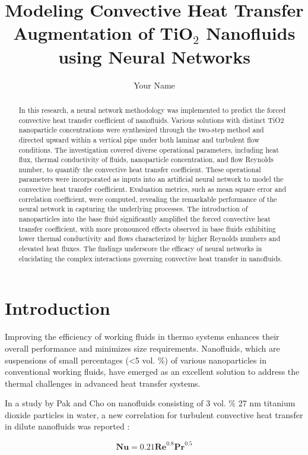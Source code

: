 \documentclass{article}
\title{Modeling Convective Heat Transfer Augmentation of TiO$_2$ Nanofluids using Neural Networks}
\author{Your Name}
\date{}
\begin{document}
\maketitle

\begin{abstract}
In this research, a neural network methodology was implemented to predict the forced convective heat transfer coefficient of nanofluids. Various solutions with distinct TiO2 nanoparticle concentrations were synthesized through the two-step method and directed upward within a vertical pipe under both laminar and turbulent flow conditions. The investigation covered diverse operational parameters, including heat flux, thermal conductivity of fluids, nanoparticle concentration, and flow Reynolds number, to quantify the convective heat transfer coefficient. These operational parameters were incorporated as inputs into an artificial neural network to model the convective heat transfer coefficient. Evaluation metrics, such as mean square error and correlation coefficient, were computed, revealing the remarkable performance of the neural network in capturing the underlying processes. The introduction of nanoparticles into the base fluid significantly amplified the forced convective heat transfer coefficient, with more pronounced effects observed in base fluids exhibiting lower thermal conductivity and flows characterized by higher Reynolds numbers and elevated heat fluxes. The findings underscore the efficacy of neural networks in elucidating the complex interactions governing convective heat transfer in nanofluids.
\end{abstract}

\section{Introduction}
Improving the efficiency of working fluids in thermo systems enhances their overall performance and minimizes size requirements. Nanofluids, which are suspensions of small percentages (<5 vol.  \%) of various nanoparticles in conventional working fluids, have emerged as an excellent solution to address the thermal challenges in advanced heat transfer systems.

In a study by Pak and Cho on nanofluids consisting of 3 vol.  \% 27 nm titanium dioxide particles in water, a new correlation for turbulent convective heat transfer in dilute nanofluids was reported \cite{ref1}:

\begin{equation}
 \mathbf{Nu} = 0.21 \mathbf{Re}^{0.8} \mathbf{Pr}^{0.5}
\end{equation}
\end{document}
